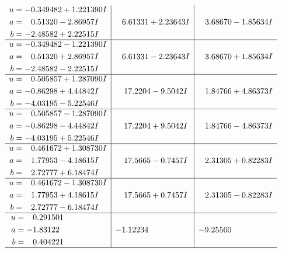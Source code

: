 \documentclass[1p]{elsarticle_modified}
\theoremstyle{definition}
\begin{document}
$$\begin{array}{c|c|c}
\begin{aligned}
u &= -0.349482 + 1.221390 I \\
a &= \phantom{-}0.51320 - 2.86957 I \\
b &= -2.48582 + 2.22515 I\end{aligned}
 & \phantom{-}6.61331 + 2.23643 I & \phantom{-}3.68670 - 1.85634 I \\ \hline\begin{aligned}
u &= -0.349482 - 1.221390 I \\
a &= \phantom{-}0.51320 + 2.86957 I \\
b &= -2.48582 - 2.22515 I\end{aligned}
 & \phantom{-}6.61331 - 2.23643 I & \phantom{-}3.68670 + 1.85634 I \\ \hline\begin{aligned}
u &= \phantom{-}0.505857 + 1.287090 I \\
a &= -0.86298 + 4.44842 I \\
b &= -4.03195 - 5.22546 I\end{aligned}
 & \phantom{-}17.2204 - 9.5042 I & \phantom{-}1.84766 + 4.86373 I \\ \hline\begin{aligned}
u &= \phantom{-}0.505857 - 1.287090 I \\
a &= -0.86298 - 4.44842 I \\
b &= -4.03195 + 5.22546 I\end{aligned}
 & \phantom{-}17.2204 + 9.5042 I & \phantom{-}1.84766 - 4.86373 I \\ \hline\begin{aligned}
u &= \phantom{-}0.461672 + 1.308730 I \\
a &= \phantom{-}1.77953 - 4.18615 I \\
b &= \phantom{-}2.72777 + 6.18474 I\end{aligned}
 & \phantom{-}17.5665 - 0.7457 I & \phantom{-}2.31305 + 0.82283 I \\ \hline\begin{aligned}
u &= \phantom{-}0.461672 - 1.308730 I \\
a &= \phantom{-}1.77953 + 4.18615 I \\
b &= \phantom{-}2.72777 - 6.18474 I\end{aligned}
 & \phantom{-}17.5665 + 0.7457 I & \phantom{-}2.31305 - 0.82283 I \\ \hline\begin{aligned}
u &= \phantom{-}0.291501\phantom{ +0.000000I} \\
a &= -1.83122\phantom{ +0.000000I} \\
b &= \phantom{-}0.404221\phantom{ +0.000000I}\end{aligned}
 & -1.12234\phantom{ +0.000000I} & -9.25560\phantom{ +0.000000I}\\
 \hline 
 \end{array}$$\newpage\newpage\renewcommand{\arraystretch}{1}
\end{document}
